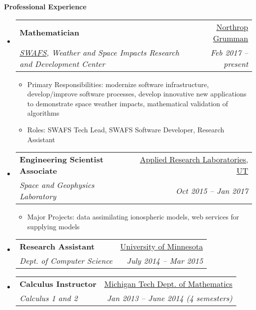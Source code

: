 \documentclass[letterpaper,11pt]{article}
\makeatletter
\newcommand{\resitem}[1]{\item #1 \vspace{-2pt}}
\newcommand{\resheading}[1]{{\large \textbf{#1}}}
\newcommand{\ressubheading}[4]{
\begin{tabular*}{6.5in}{l@{\extracolsep{\fill}}r}
		\textbf{#1} & #2 \\
		\textit{#3} & \textit{#4} \\
\end{tabular*}\vspace{-6pt}}
\makeatother
\begin{document}
\resheading{Professional Experience}
\begin{itemize}
\item%
  \ressubheading{Mathematician}{\href{https://www.northropgrumman.com}{Northrop Grumman}}{
      \href{http://www.northropgrumman.com/Capabilities/SpaceWeatherAnalysis/Pages/default.aspx}{SWAFS},
        Weather and Space Impacts Research and Development Center}{Feb 2017 -- present}
  {\footnotesize
  \begin{itemize}  
    \resitem{Primary Responsibilities: modernize software infrastructure, develop/improve software
          processes, develop innovative  new applications to demonstrate space weather impacts,
          mathematical validation of algorithms}
    \resitem{Roles: SWAFS Tech Lead, SWAFS Software Developer, Research Assistant}
  \end{itemize}
  }
\item%
  \ressubheading{Engineering Scientist Associate}{\href{https://www.arlut.utexas.edu}{Applied Research Laboratories, UT}}{Space and Geophysics Laboratory}{Oct 2015 -- Jan 2017}
  {\footnotesize
  \begin{itemize}  
    \resitem{Major Projects: data assimilating ionospheric models, web services for supplying models}
  \end{itemize}
  }
\item
  \ressubheading{Research Assistant}{\href{https://www.cs.umn.edu}{University of Minnesota}}{Dept. of Computer Science}{July 2014 -- Mar 2015}
\item%
  \ressubheading{Calculus Instructor}{\href{www.mtu.edu/math/}{Michigan Tech Dept. of Mathematics}}{Calculus 1 and 2}{Jan 2013 -- June 2014 (4 semesters)}
\begin{comment}	
\item%
  \ressubheading{Lab TA}{\href{www.mtu.edu/physics}{Michigan Tech}}{Introductory Mechanics, Electronics, Mathematica}{Aug 2009 -- Apr 2012}
	{\footnotesize
	\begin{itemize}
		\resitem{Responsibilities: grade labs; lead lab sections; assist students with Mathematica}
		\resitem{Mathlab (Aug 2009 - Apr 2011), Mechanics (Aug 2010 - Dec 2011), Electronics (Jan 2012 - May 2012)}
	\end{itemize}
	}
\item%
  \ressubheading{MathLab Lab Consultant}{\href{www.mtu.edu/math/}{Michigan Tech Dept. of Mathematical Sciences}}{Calculus 1,2, and 3}{Jan 2009 -- Apr 2011}
	{\footnotesize
	\begin{itemize}
		\resitem{8 to 15 hours per week}
	\end{itemize}
	}
\end{comment}
\end{itemize}
\end{document}
